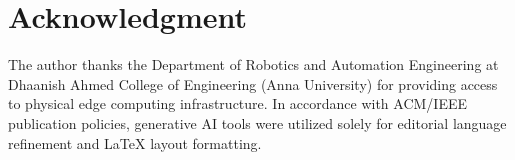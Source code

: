 \documentclass[10pt, conference]{IEEEtran}
\begin{document}
\section*{Acknowledgment}
The author thanks the Department of Robotics and Automation Engineering at Dhaanish Ahmed College of Engineering (Anna University) for providing access to physical edge computing infrastructure. In accordance with ACM/IEEE publication policies, generative AI tools were utilized solely for editorial language refinement and LaTeX layout formatting.



\end{document}
